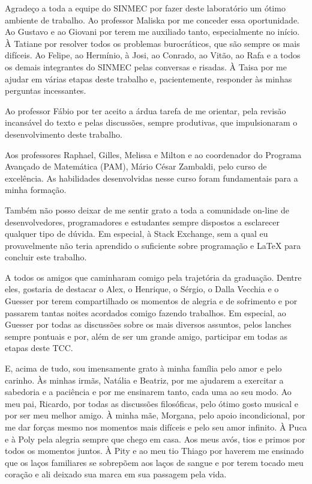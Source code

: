 \begin{agradecimentos}
	Agradeço a toda a equipe do SINMEC por fazer deste laboratório um ótimo ambiente de trabalho. Ao professor Maliska por me conceder essa oportunidade. Ao Gustavo e ao Giovani por terem me auxiliado tanto, especialmente no início. À Tatiane por resolver todos os problemas burocráticos, que são sempre os mais difíceis. Ao Felipe, ao Hermínio, à Josi, ao Conrado, ao Vitão, ao Rafa e a todos os demais integrantes do SINMEC pelas conversas e risadas. À Taisa por me ajudar em várias etapas deste trabalho e, pacientemente, responder às minhas perguntas incessantes.

	Ao professor Fábio por ter aceito a árdua tarefa de me orientar, pela revisão incansável do texto e pelas discussões, sempre produtivas, que impulsionaram o desenvolvimento deste trabalho.

	Aos professores Raphael, Gilles, Melissa e Milton e ao coordenador do Programa Avançado de Matemática (PAM), Mário César Zambaldi, pelo curso de excelência. As habilidades desenvolvidas nesse curso foram fundamentais para a minha formação.

	Também não posso deixar de me sentir grato a toda a comunidade on-line de desenvolvedores, programadores e estudantes sempre dispostos a esclarecer qualquer tipo de dúvida. Em especial, à Stack Exchange, sem a qual eu provavelmente não teria aprendido o suficiente sobre programação e \LaTeX{} para concluir este trabalho.

	A todos os amigos que caminharam comigo pela trajetória da graduação. Dentre eles, gostaria de destacar o Alex, o Henrique, o Sérgio, o Dalla Vecchia e o Guesser por terem compartilhado os momentos de alegria e de sofrimento e por passarem tantas noites acordados comigo fazendo trabalhos. Em especial, ao Guesser por todas as discussões sobre os mais diversos assuntos, pelos lanches sempre pontuais e por, além de ser um grande amigo, participar em todas as etapas deste TCC.

	E, acima de tudo, sou imensamente grato à minha família pelo amor e pelo carinho. Às minhas irmãs, Natália e Beatriz, por me ajudarem a exercitar a sabedoria e a paciência e por me ensinarem tanto, cada uma ao seu modo. Ao meu pai, Ricardo, por todas as discussões filosóficas, pelo ótimo gosto musical e por ser meu melhor amigo. À minha mãe, Morgana, pelo apoio incondicional, por me dar forças mesmo nos momentos mais difíceis e pelo seu amor infinito. À Puca e à Poly pela alegria sempre que chego em casa. Aos meus avós, tios e primos por todos os momentos juntos. À Pity e ao meu tio Thiago por haverem me ensinado que os laços familiares se sobrepõem aos laços de sangue e por terem tocado meu coração e ali deixado sua marca em sua passagem pela vida.
\end{agradecimentos}